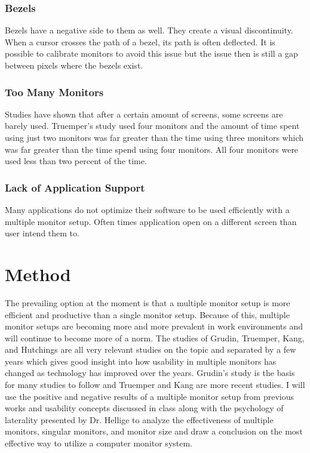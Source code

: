 \documentclass[a4paper]{article}
\begin{document}
\subsubsection{Bezels}
Bezels have a negative side to them as well. They create a visual discontinuity.  When a cursor crosses the path of a bezel, its path is often deflected. It is possible to calibrate monitors to avoid this issue but the issue then is still a gap between pixels where the bezels exist.\cite{Truemper} 

\subsubsection{Too Many Monitors}
Studies have shown that after a certain amount of screens, some screens are barely used. Truemper's study used four monitors and the amount of time spent using just two monitors was far greater than the time using three monitors which was far greater than the time spend using four monitors. All four monitors were used less than two percent of the time.\cite{Truemper}

\subsubsection{Lack of Application Support}
Many applications do not optimize their software to be used efficiently with a multiple monitor setup.\cite{Grudin} Often times application open on a different screen than user intend them to.\cite{Grudin}


\section{Method}
The prevailing option at the moment is that a multiple monitor setup is more efficient and productive than a single monitor setup. Because of this, multiple monitor setups are becoming more and more prevalent in work environments and will continue to become more of a norm. The studies of Grudin, Truemper, Kang, and Hutchings are all very relevant studies on the topic and separated by a few years which gives good insight into how usability in multiple monitors has changed as technology has improved over the years. Grudin's study is the basis for many studies to follow and Truemper and Kang are more recent studies. I will use the positive and negative results of a multiple monitor setup from previous works and usability concepts discussed in class along with the psychology of laterality presented by Dr. Hellige to analyze the effectiveness of multiple monitors, singular monitors, and monitor size and draw a conclusion on the most effective way to utilize a computer monitor system.
\end{document}
